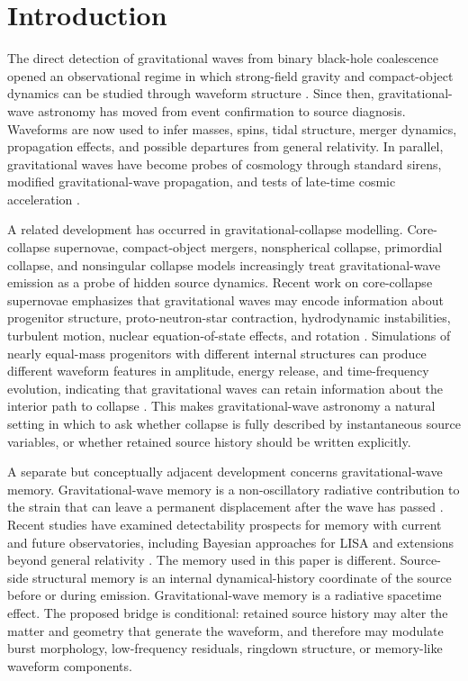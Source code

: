 \documentclass[11pt]{article}
\begin{document}
\section{Introduction}

The direct detection of gravitational waves from binary black-hole coalescence opened an observational regime in which strong-field gravity and compact-object dynamics can be studied through waveform structure \citep{Abbott2016GW150914}. Since then, gravitational-wave astronomy has moved from event confirmation to source diagnosis. Waveforms are now used to infer masses, spins, tidal structure, merger dynamics, propagation effects, and possible departures from general relativity. In parallel, gravitational waves have become probes of cosmology through standard sirens, modified gravitational-wave propagation, and tests of late-time cosmic acceleration \citep{Belgacem2018ModifiedGW,Belgacem2019TestingMG,Tagliazucchi2025StandardSiren}.

A related development has occurred in gravitational-collapse modelling. Core-collapse supernovae, compact-object mergers, nonspherical collapse, primordial collapse, and nonsingular collapse models increasingly treat gravitational-wave emission as a probe of hidden source dynamics. Recent work on core-collapse supernovae emphasizes that gravitational waves may encode information about progenitor structure, proto-neutron-star contraction, hydrodynamic instabilities, turbulent motion, nuclear equation-of-state effects, and rotation \citep{Muller2017CCSN,Muller2026CCSNReview,Murphy2026Progenitor}. Simulations of nearly equal-mass progenitors with different internal structures can produce different waveform features in amplitude, energy release, and time-frequency evolution, indicating that gravitational waves can retain information about the interior path to collapse \citep{Murphy2026Progenitor}. This makes gravitational-wave astronomy a natural setting in which to ask whether collapse is fully described by instantaneous source variables, or whether retained source history should be written explicitly.

A separate but conceptually adjacent development concerns gravitational-wave memory. Gravitational-wave memory is a non-oscillatory radiative contribution to the strain that can leave a permanent displacement after the wave has passed \citep{Favata2010Memory,Lasky2016Memory}. Recent studies have examined detectability prospects for memory with current and future observatories, including Bayesian approaches for LISA and extensions beyond general relativity \citep{Cogez2026LISAMemory,Gasparotto2026BeyondGRMemory}. The memory used in this paper is different. Source-side structural memory is an internal dynamical-history coordinate of the source before or during emission. Gravitational-wave memory is a radiative spacetime effect. The proposed bridge is conditional: retained source history may alter the matter and geometry that generate the waveform, and therefore may modulate burst morphology, low-frequency residuals, ringdown structure, or memory-like waveform components.
\end{document}
